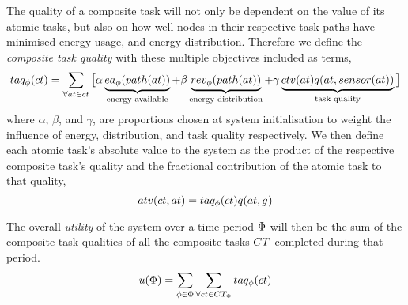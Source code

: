 The quality of a composite task will not only be dependent on the value of its atomic tasks, but also on how well nodes in their respective task-paths have minimised energy usage, and energy distribution. Therefore we define the \textit{composite task quality} with these multiple objectives included as terms,
\begin{equation}
	\label{eq:ctv}
	\functionCompositeTaskQuality{}{} = 
	\sum\limits_{\forall \varAtomicTask{}{} \in \varCompositeTask{}{}}
	\big\lbrack
	\alpha\underbrace{\functionEnergyAvailable{\functionTaskArc{}{}}{}}_{\text{energy available}}
	+ \beta\underbrace{\functionEnergyVariability{\functionTaskArc{}{}}{}}_{\text{energy distribution}}
	+ 
	\gamma\underbrace{
		\functionComponentTaskValue{}{}
		\functionAtomicTaskQualitySignature{\varAtomicTask{}{}}{\functionSenseRole{}{}}
	}_{\text{task quality}}
\big\rbrack
\end{equation}
where $\alpha$, $\beta$, and $\gamma$, are proportions chosen at system initialisation to weight the influence of energy, distribution, and task quality respectively. We then define each atomic task's absolute value to the system as the product of the respective composite task's quality and the fractional contribution of the atomic task to that quality,
\begin{equation}
	\functionTaskAbsoluteValue{}{} = 
	\functionCompositeTaskQuality{}{}
	\functionAtomicTaskQualitySignature{}{}
\end{equation}

The overall \textit{ utility} of the system over a time period $\Phi$ will then be the sum of the composite task qualities of all the composite tasks $\setCompositeTask{}{}$ completed during that period.
	\begin{equation}
		\label{eq:system_utility}
		\functionSystemUtility{}{} = \sum\limits_{\varTime{}{} \in \setTime{}{}}
		\sum\limits_{\forall \varCompositeTask{}{} \in \setCompositeTask{\setTime{}{}}{}}
		\functionCompositeTaskQuality{}{}
	\end{equation}